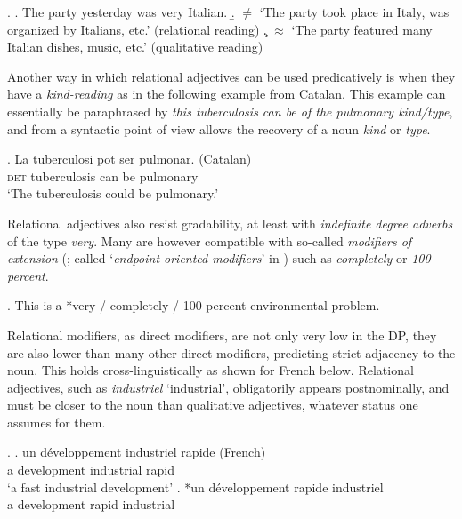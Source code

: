 \documentclass [output=book,colorlinks,citecolor=brown]{langscibook}
\begin{document}
\ex. \label{italian party} \a. The party yesterday was very Italian.
\b. $\neq$ `The party took place in Italy, was organized by Italians, etc.’ (relational reading)
\c. $\approx$ `The party featured many Italian dishes, music, etc.’ (qualitative reading)

Another way in which relational adjectives can be used predicatively is when they have a \textit{kind-reading} \citep{mcnally:2004:relational} as in the following example from Catalan. This example can essentially be paraphrased by \textit{this tuberculosis can be of the pulmonary kind/type}, and from a syntactic point of view allows the recovery of a noun \textit{kind} or \textit{type}. %


\exg. La tuberculosi pot ser pulmonar. (Catalan)\\
\textsc{det} tuberculosis can be pulmonary\\
`The tuberculosis could be pulmonary.’ \\ \null \hfill \citep[189]{mcnally:2004:relational}

Relational adjectives also resist gradability, at least with \textit{indefinite degree adverbs} \citep{fabregas:2014:adjectival} of the type \textit{very}. Many are however compatible with so-called \textit{modifiers of extension} (\citealt{fabregas:2014:adjectival}; called `\textit{endpoint-oriented modifiers}' in \citealt{kennedy:2005:scale}) such as \textit{completely} or \textit{100 percent}.

\ex. This is a *very / completely / 100 percent environmental problem.

Relational modifiers, as direct modifiers, are not only very low in the DP, they are also lower than many other direct modifiers, predicting strict adjacency to the noun. This holds cross-linguistically as shown for French below. Relational adjectives, such as \textit{industriel} `industrial’, obligatorily appears postnominally, and must be closer to the noun than qualitative adjectives, whatever status one assumes for them. %

\ex. \ag. un développement industriel rapide (French)\\
a development industrial rapid\\
`a fast industrial development’
\bg. *un développement rapide industriel\\
a development rapid industrial \null \hfill \citep[61]{bortolotto:2016:RA}\\
\end{document}
